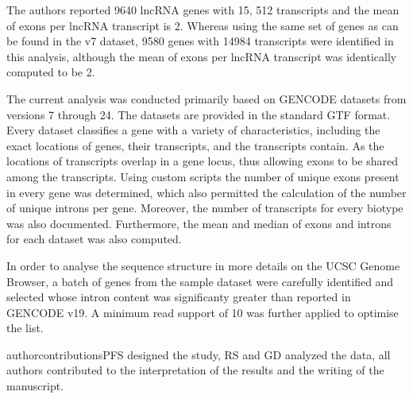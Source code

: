 \documentclass[ncrna,article,submit,moreauthors,pdftex,10pt,a4paper]{mdpi}
\begin{document}
The authors reported 9640 lncRNA genes with 15, 512 transcripts and the mean of exons per lncRNA transcript is 2.
Whereas using the same set of genes as can be found in the v7 dataset, 9580 genes with 14984 transcripts were identified in this analysis, although 
the mean of exons per lncRNA transcript was identically computed to be 2.


The current analysis was conducted primarily based on GENCODE datasets from versions 7 through 24. 
The datasets are provided in the standard GTF format. Every dataset classifies a gene with a variety of characteristics, including
the exact locations of genes, their transcripts, and the transcripts contain. As the locations of transcripts overlap in a
gene locus, thus allowing exons to be shared among the transcripts.
Using custom scripts the number of unique exons present in every gene was determined, which also permitted the calculation
of the number of unique introns per gene. Moreover, the number of transcripts for every biotype was also documented.
Furthermore, the mean and median of exons and introns for each dataset was
also computed.


In order to analyse the sequence structure in more details on the UCSC Genome Browser, a batch of genes from the sample dataset 
were carefully identified and selected whose intron content was significanty greater than reported in GENCODE v19. A minimum read support of 10
was further applied to optimise the list.




\vspace{6pt} 



authorcontributions{PFS designed the study, RS and GD analyzed the data,
  all authors contributed to the interpretation of the results and the
  writing of the manuscript.}






\clearpage 
\end{document}
